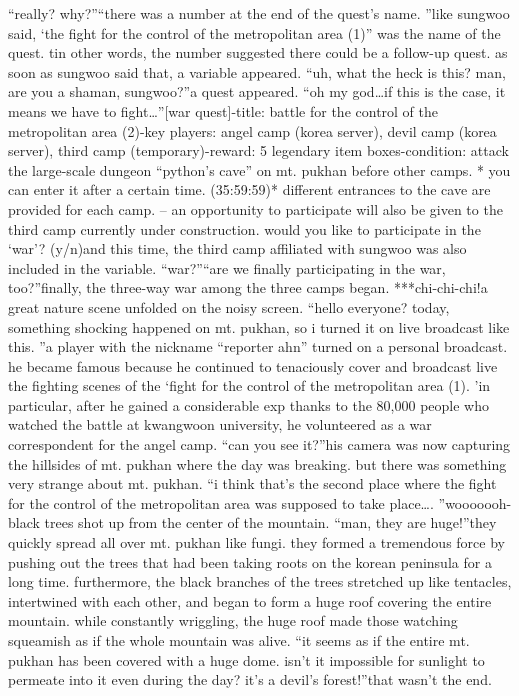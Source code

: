 “really? why?”“there was a number at the end of the quest’s name.
”like sungwoo said, ‘the fight for the control of the metropolitan area (1)” was the name of the quest.
 tin other words, the number suggested there could be a follow-up quest.
as soon as sungwoo said that, a variable appeared.
“uh, what the heck is this? man, are you a shaman, sungwoo?”a quest appeared.
“oh my god…if this is the case, it means we have to fight…”[war quest]-title: battle for the control of the metropolitan area (2)-key players: angel camp (korea server), devil camp (korea server), third camp (temporary)-reward: 5 legendary item boxes-condition: attack the large-scale dungeon “python’s cave” on mt.
 pukhan before other camps.
* you can enter it after a certain time.
 (35:59:59)* different entrances to the cave are provided for each camp.
– an opportunity to participate will also be given to the third camp currently under construction.
would you like to participate in the ‘war’? (y/n)and this time, the third camp affiliated with sungwoo was also included in the variable.
“war?”“are we finally participating in the war, too?”finally, the three-way war among the three camps began.
***chi-chi-chi!a great nature scene unfolded on the noisy screen.
“hello everyone? today, something shocking happened on mt.
 pukhan, so i turned it on live broadcast like this.
”a player with the nickname “reporter ahn” turned on a personal broadcast.
 he became famous because he continued to tenaciously cover and broadcast live the fighting scenes of the ‘fight for the control of the metropolitan area (1).
’in particular, after he gained a considerable exp thanks to the 80,000 people who watched the battle at kwangwoon university, he volunteered as a war correspondent for the angel camp.
“can you see it?”his camera was now capturing the hillsides of mt.
 pukhan where the day was breaking.
but there was something very strange about mt.
 pukhan.
“i think that’s the second place where the fight for the control of the metropolitan area was supposed to take place….
”wooooooh-black trees shot up from the center of the mountain.
“man, they are huge!”they quickly spread all over mt.
 pukhan like fungi.
 they formed a tremendous force by pushing out the trees that had been taking roots on the korean peninsula for a long time.
furthermore, the black branches of the trees stretched up like tentacles, intertwined with each other, and began to form a huge roof covering the entire mountain.
while constantly wriggling, the huge roof made those watching squeamish as if the whole mountain was alive.
“it seems as if the entire mt.
 pukhan has been covered with a huge dome.
 isn’t it impossible for sunlight to permeate into it even during the day? it’s a devil’s forest!”that wasn’t the end.


 